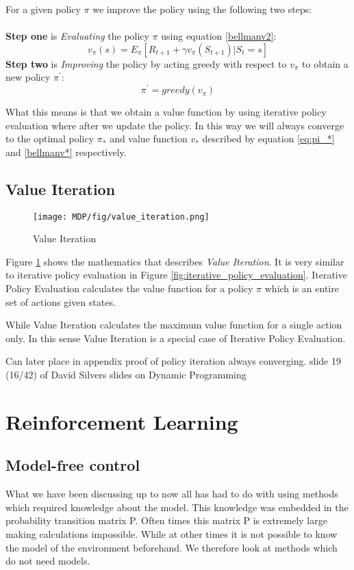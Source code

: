 For a given policy $\pi$ we improve the policy using the following two steps:\\\\
\textbf{Step one} is \textit{Evaluating} the policy $\pi$ using equation \ref{bellmanv2}: \[v_{\pi}(s) = E_{\pi}[R_{t+1} + \gamma v_{\pi}(S_{t+1})|S_t = s]\]
\textbf{Step two} is \textit{Improving} the policy by acting greedy with respect to $v_\pi$ to obtain a new policy $\pi^{'}$:
\[\pi^{'} = greedy(v_{\pi})\]

What this means is that we obtain a value function by using iterative policy evaluation where after we update the policy. In this way we will always converge to the optimal policy $\pi_{*}$ and value function $v_{*}$ described by equation \ref{eq:pi_*} and \ref{bellmanv*} respectively.
\subsection{Value Iteration}
\begin{figure}[!htb]
	\centering
	\texttt{[image: MDP/fig/value\_iteration.png]}
	\caption{Value Iteration\cite{David_Silver}}
	\label{fig:value_iteration}
\end{figure}
Figure \ref{fig:value_iteration} shows the mathematics that describes \textit{Value Iteration}. It is very similar to iterative policy evaluation in Figure \ref{fig:iterative_policy_evaluation}. Iterative Policy Evaluation calculates the value function for a policy $\pi$ which is an entire set of actions given states.

While Value Iteration calculates the maximum value function for a single action only. In this sense Value Iteration is a special case of Iterative Policy Evaluation.

{\color{red} Can later place in appendix proof of policy iteration always converging. slide 19 (16/42) of David Silvers slides on Dynamic Programming}
\section{Reinforcement Learning}
\subsection{Model-free control}
What we have been discussing up to now all has had to do with using methods which required knowledge about the model. This knowledge was embedded in the probability transition matrix P. Often times this matrix P is extremely large making calculations impossible. While at other times it is not possible to know the model of the environment beforehand. We therefore look at methods which do not need models.

